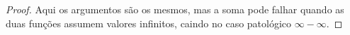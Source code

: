 \begin{proof}
    Aqui os argumentos são os mesmos, mas a soma pode falhar quando as duas funções assumem valores infinitos, caindo no caso patológico $\infty - \infty$.
\end{proof}